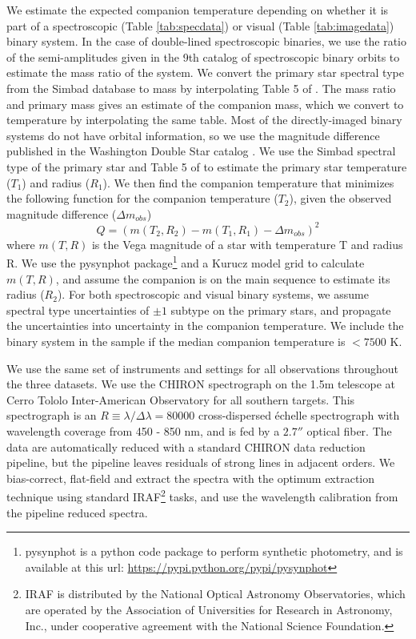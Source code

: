 \documentclass{emulateapj}
\begin{document}
We estimate the expected companion temperature depending on whether it is part of a spectroscopic (Table \ref{tab:specdata}) or visual (Table \ref{tab:imagedata}) binary system. In the case of double-lined spectroscopic binaries, we use the ratio of the semi-amplitudes given in the 9th catalog of spectroscopic binary orbits \citep[SB9,][]{SB9} to estimate the mass ratio of the system. We convert the primary star spectral type from the Simbad database \citep{Simbad} to mass by interpolating Table 5 of \citet{Pecaut2013}. The mass ratio and primary mass gives an estimate of the companion mass, which we convert to temperature by interpolating the same table. Most of the directly-imaged binary systems do not have orbital information, so we use the magnitude difference published in the Washington Double Star catalog \citep[WDS, ][]{WDS}. We use the Simbad spectral type of the primary star and Table 5 of \citet{Pecaut2013} to estimate the primary star temperature ($T_1$) and radius ($R_1$). We then find the companion temperature that minimizes the following function for the companion temperature ($T_2$), given the observed magnitude difference ($\Delta m_{obs}$)
\begin{equation}
Q = (m(T_2, R_2) - m(T_1, R_1) - \Delta m_{obs})^2
\label{eqn:secteff}
\end{equation}
where $m(T, R)$ is the Vega magnitude of a star with temperature T and radius R. We use the pysynphot package\footnote{pysynphot is a python code package to perform synthetic photometry, and is available at this url: \url{https://pypi.python.org/pypi/pysynphot}} and a Kurucz model grid \citep{Castelli2003} to calculate $m(T, R)$, and assume the companion is on the main sequence to estimate its radius ($R_2$). For both spectroscopic and visual binary systems, we assume spectral type uncertainties of $\pm 1$ subtype on the primary stars, and propagate the uncertainties into uncertainty in the companion temperature. We include the binary system in the sample if the median companion temperature is $< 7500$ K. 

We use the same set of instruments and settings for all observations throughout the three datasets. We use the CHIRON spectrograph \citep{CHIRON} on the 1.5m telescope at Cerro Tololo Inter-American Observatory for all southern targets. This spectrograph is an $R\equiv \lambda / \Delta \lambda = 80000$ cross-dispersed \'echelle spectrograph with wavelength coverage from 450 - 850 nm, and is fed by a $2.7''$ optical fiber. The data are automatically reduced with a standard CHIRON data reduction pipeline, but the pipeline leaves residuals of strong lines in adjacent orders. We bias-correct, flat-field and extract the spectra with the optimum extraction technique \citep{Horne1986} using standard IRAF\footnote{IRAF is distributed by the National Optical Astronomy Observatories, which are operated by the Association of Universities for Research in Astronomy, Inc., under cooperative agreement with the National Science Foundation.} tasks, and use the wavelength calibration from the pipeline reduced spectra.
\end{document}
